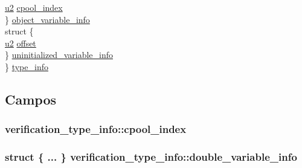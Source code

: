 \begin{DoxyCompactItemize}
\begin{tabbing}
\>\>\hyperlink{lista__operandos_8h_a732cde1300aafb73b0ea6c2558a7a54f}{u2} \hyperlink{structverification__type__info_a5be06fb276eacd06d97febe64d7be884}{cpool\_index}\\
\>\} \hyperlink{structverification__type__info_a7c237ceba51b307a76bbacaa30702e90}{object\_variable\_info}\\
\>struct \{\\
\>\>\hyperlink{lista__operandos_8h_a732cde1300aafb73b0ea6c2558a7a54f}{u2} \hyperlink{structverification__type__info_a697499159761ac261e39a9f7aabfb27d}{offset}\\
\>\} \hyperlink{structverification__type__info_add124f08b7f592406443d601651970d9}{uninitialized\_variable\_info}\\
\} \hyperlink{structverification__type__info_ab47e1887d0e10211164b9d0a16d79565}{type\_info}\\

\end{tabbing}\end{DoxyCompactItemize}


\subsection{Campos}
\subsubsection[{\texorpdfstring{cpool\+\_\+index}{cpool_index}}]{ verification\+\_\+type\+\_\+info\+::cpool\+\_\+index}\hypertarget{structverification__type__info_a5be06fb276eacd06d97febe64d7be884}{}\label{structverification__type__info_a5be06fb276eacd06d97febe64d7be884}
\subsubsection[{\texorpdfstring{double\+\_\+variable\+\_\+info}{double_variable_info}}]{\setlength{\rightskip}{0pt plus 5cm}struct \{ ... \}   verification\+\_\+type\+\_\+info\+::double\+\_\+variable\+\_\+info}\hypertarget{structverification__type__info_ae2e04072010fa85856e99f2e5b723c1e}{}\label{structverification__type__info_ae2e04072010fa85856e99f2e5b723c1e}
